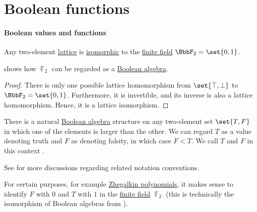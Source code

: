 \section{Boolean functions}\label{sec:boolean_functions}

\paragraph{Boolean values and functions}

\begin{proposition}\label{thm:two_element_lattice}
  Any two-element \hyperref[def:lattice]{lattice} is \hyperref[def:lattice/homomorphism]{isomorphic} to the \hyperref[def:finite_field]{finite field} \( \BbbF_2 = \set{ 0, 1 } \).
\end{proposition}
\begin{comments}
  \item {} shows how \( \BbbF_2 \) can be regarded as a \hyperref[def:boolean_algebra]{Boolean algebra}.
\end{comments}
\begin{proof}
  There is only one possible lattice homomorphism from \( \set{ \top, \bot } \) to \( \BbbF_2 = \set{ 0, 1 } \). Furthermore, it is invertible, and its inverse is also a lattice homomorphism. Hence, it is a lattice isomorphism.
\end{proof}

\begin{concept}\label{con:boolean_value}\mimprovised
  There is a natural \hyperref[def:boolean_algebra]{Boolean algebra} structure on any two-element set \( \set{ T, F } \) in which one of the elements is larger than the other. We can regard \( T \) as a value denoting truth and \( F \) as denoting falsity, in which case \( F < T \). We call \( T \) and \( F \) in this context .
\end{concept}
\begin{comments}
  \item See  for more discussions regarding related notation conventions.

  \item For certain purposes, for example \hyperref[def:zhegalkin_polynomial]{Zhegalkin polynomials}, it makes sense to identify \( F \) with \( 0 \) and \( T \) with \( 1 \) in the \hyperref[def:finite_field]{finite field} \( \BbbF_2 \) (this is technically the isomorphism of Boolean algebras from ).
\end{comments}

